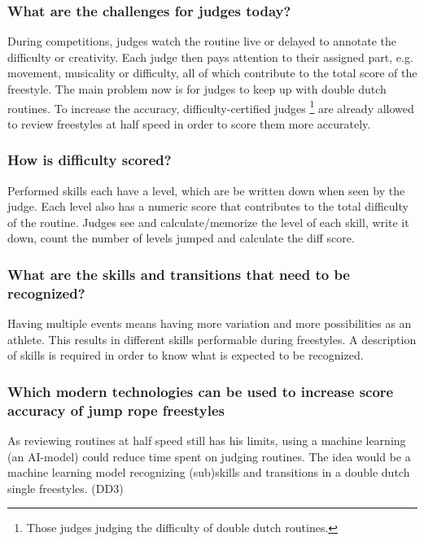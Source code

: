 \subsubsection{What are the challenges for judges today?}
\label{intro-bp:question-challenges-for-judges}

During competitions, judges watch the routine live or delayed to annotate the difficulty or creativity. Each judge then pays attention to their assigned part, e.g. movement, musicality or difficulty, all of which contribute to the total score of the freestyle. The main problem now is for judges to keep up with double dutch routines. To increase the accuracy, difficulty-certified judges \footnote{Those judges judging the difficulty of double dutch routines.} are already allowed to review freestyles at half speed in order to score them more accurately.

\subsubsection{How is difficulty scored?}
\label{intro-bp:question-difficulty-scored}

Performed skills each have a level, which are be written down when seen by the judge. Each level also has a numeric score that contributes to the total difficulty of the routine. Judges see and calculate/memorize the level of each skill, write it down, count the number of levels jumped and calculate the diff score.

\subsubsection{What are the skills and transitions that need to be recognized?}
\label{intro-bp:question-what-are-the-skills-to-be-recognized}

Having multiple events means having more variation and more possibilities as an athlete. This results in different skills performable during freestyles. A description of skills is required in order to know what is expected to be recognized.

\subsubsection{Which modern technologies can be used to increase score accuracy of jump rope freestyles}
\label{intro-bp:question-which-modern-technologies}

As reviewing routines at half speed still has his limits, using a machine learning (an AI-model) could reduce time spent on judging routines. The idea would be a machine learning model recognizing (sub)skills and transitions in a double dutch single freestyles. (DD3)

